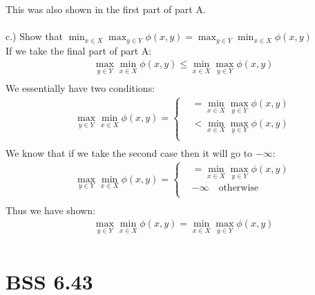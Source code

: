 \documentclass[12pt]{article}
\begin{document}
    This was also shown in the first part of part A.\\\\
    c.) Show that $\min_{x \in X} \max_{y \in Y} \phi(x,y) = \max_{y \in Y} \min_{x \in X} \phi(x,y)$\\
    If we take the final part of part A:\\
        \begin{align*}
             &\max_{y \in Y} \min_{x \in X} \phi(x,y) \leq \min_{x \in X} \max_{y \in Y} \phi(x,y)\\
        \end{align*}
    We essentially have two conditions:\\
        \begin{align*}
            &\max_{y \in Y} \min_{x \in X} \phi(x,y) = 
            \begin{cases}
                     &= \min_{x \in X} \max_{y \in Y} \phi(x,y)\\
                    &< \min_{x \in X} \max_{y \in Y} \phi(x,y)\\
                \end{cases}\\
        \end{align*}
    We know that if we take the second case then it will go to $-\infty$:\\
        \begin{align*}
            &\max_{y \in Y} \min_{x \in X} \phi(x,y) = 
            \begin{cases}
                     &= \min_{x \in X} \max_{y \in Y} \phi(x,y)\\
                    &-\infty \quad \text{otherwise}\\
                \end{cases}\\
        \end{align*}
    Thus we have shown:\\
        \begin{align*}
             &\max_{y \in Y} \min_{x \in X} \phi(x,y) = \min_{x \in X} \max_{y \in Y} \phi(x,y)\\
        \end{align*}
\section{BSS 6.43}
\end{document}
